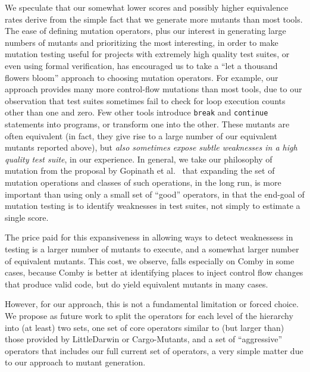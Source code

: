 \documentclass[sigconf,review, anonymous]{acmart}
\begin{document}
{We speculate that our somewhat lower scores and possibly higher
equivalence rates derive from the simple fact that we generate more
mutants than most tools.  The ease of defining mutation operators,
plus our interest in generating large numbers of mutants and
prioritizing the most interesting, in order to make mutation testing useful for
projects with extremely high quality test suites, or even using formal
verification, has encouraged us to take a ``let a thousand flowers bloom''
approach to choosing mutation operators.  For example, our approach
provides many more control-flow mutations than most tools, due to our
observation that test suites sometimes fail to check for loop
execution counts other than one and zero.  Few other tools introduce
{\tt break} and {\tt continue} statements into programs, or transform
one into the other.  These mutants are often equivalent (in fact, they
give rise to a large number of our equivalent mutants reported above), but \emph{also
sometimes expose subtle weaknesses in a high quality test suite}, in our
experience.  In general, we take our philosophy of mutation from the
proposal by Gopinath et al.~\cite{Limits,gopinath2017mutation} that
expanding the set of mutation operations and classes of such
operations, in the long run, is more important than using only a small
set of ``good'' operators, in that the end-goal of mutation testing is
to identify weaknesses in test suites, not simply to estimate a single
score.  

The price paid for this
expansiveness in allowing ways to detect weaknessess in testing is a
larger number of mutants to execute, and a somewhat larger number of
equivalent mutants.  This cost, we observe, falls especially on Comby in some
cases, because Comby is better at identifying places to inject
control flow changes that produce valid code, but do yield equivalent mutants in
many cases.

However, for our approach, this is not a
fundamental limitation or forced choice.  We propose as future work to
split the operators for each level of the hierarchy into (at least) two sets, one
set of core operators similar to (but larger than) those provided by
LittleDarwin or Cargo-Mutants, and a set of ``aggressive'' operators
that includes our full current set of operators, a very simple matter due to
our approach to mutant generation.

}
\end{document}
